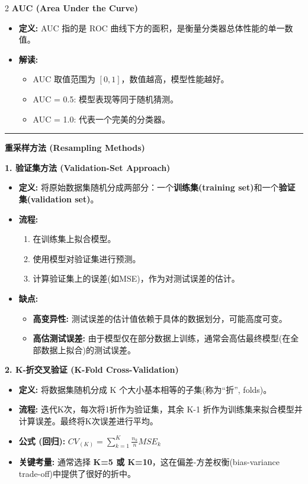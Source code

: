 \documentclass[9pt,a4paper]{article} %
\newcommand{\mysection}[1]{\vspace{0.5em}\hrule\vspace{0.3em}\noindent\textbf{\large #1}\vspace{0.1em}}
\begin{document}
\begin{multicols}{2}
\textbf{AUC (Area Under the Curve)}
\begin{itemize}
    \item \textbf{定义:} AUC 指的是 ROC 曲线下方的面积，是衡量分类器总体性能的单一数值。
    \item \textbf{解读:}
        \begin{itemize}
            \item AUC 取值范围为 $[0, 1]$，数值越高，模型性能越好。
            \item AUC = 0.5: 模型表现等同于随机猜测。
            \item AUC = 1.0: 代表一个完美的分类器。
        \end{itemize}
\end{itemize}








\mysection{重采样方法 (Resampling Methods)}

\textbf{1. 验证集方法 (Validation-Set Approach)}
\begin{itemize}
    \item \textbf{定义:} 将原始数据集随机分成两部分：一个\textbf{训练集(training set)}和一个\textbf{验证集(validation set)}。
    \item \textbf{流程:}
        \begin{enumerate}
            \item 在训练集上拟合模型。
            \item 使用模型对验证集进行预测。
            \item 计算验证集上的误差(如MSE)，作为对测试误差的估计。
        \end{enumerate}
    \item \textbf{缺点:}
        \begin{itemize}
            \item \textbf{高变异性:} 测试误差的估计值依赖于具体的数据划分，可能高度可变。
            \item \textbf{高估测试误差:} 由于模型仅在部分数据上训练，通常会高估最终模型(在全部数据上拟合)的测试误差。
        \end{itemize}
\end{itemize}

\textbf{2. K-折交叉验证 (K-Fold Cross-Validation)}
\begin{itemize}
    \item \textbf{定义:} 将数据集随机分成 K 个大小基本相等的子集(称为“折”, folds)。
    \item \textbf{流程:} 迭代K次，每次将1折作为验证集，其余 K-1 折作为训练集来拟合模型并计算误差。最终将K次误差进行平均。
    \item \textbf{公式 (回归):} $CV_{(K)} = \sum_{k=1}^{K} \frac{n_k}{n} MSE_k$
    \item \textbf{关键考量:} 通常选择 \textbf{K=5 或 K=10}，这在偏差-方差权衡(bias-variance trade-off)中提供了很好的折中。
\end{itemize}


\end{multicols}
\end{document}
